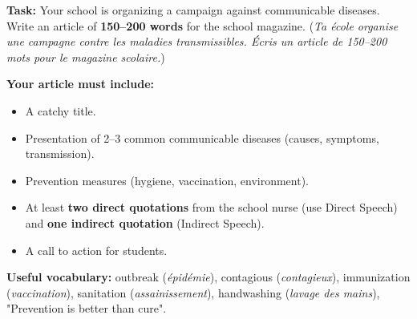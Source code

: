 \documentclass[11pt]{article}
\begin{document}
\begin{exercice}
\textbf{Task:} Your school is organizing a campaign against communicable diseases. Write an article of \textbf{150--200 words} for the school magazine. (\emph{Ta école organise une campagne contre les maladies transmissibles. Écris un article de 150--200 mots pour le magazine scolaire.})

\textbf{Your article must include:}
\begin{itemize}
    \item A catchy title.
    \item Presentation of 2--3 common communicable diseases (causes, symptoms, transmission).
    \item Prevention measures (hygiene, vaccination, environment).
    \item At least \textbf{two direct quotations} from the school nurse (use Direct Speech) and \textbf{one indirect quotation} (Indirect Speech).
    \item A call to action for students.
\end{itemize}
\textbf{Useful vocabulary:} outbreak (\textit{épidémie}), contagious (\textit{contagieux}), immunization (\textit{vaccination}), sanitation (\textit{assainissement}), handwashing (\textit{lavage des mains}), "Prevention is better than cure".
\end{exercice}
\end{document}
